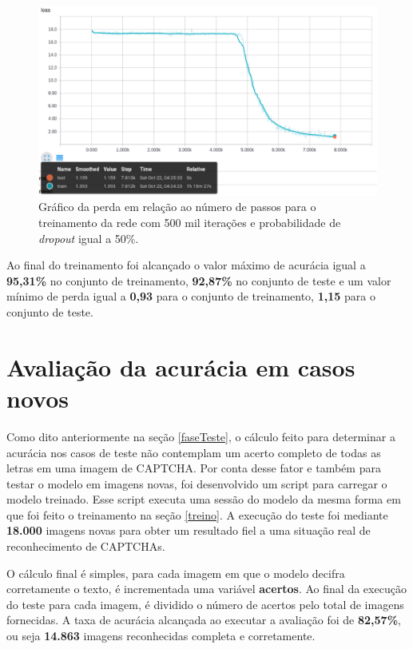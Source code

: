 \begin{figure}[H]
\centering
\includegraphics[scale=0.4]{imagens/loss_500k_dropout50}
\caption{Gráfico da perda em relação ao número de passos para o
  treinamento da rede com 500 mil iterações e probabilidade de
  \textit{dropout} igual a 50\%.}
\label{fig:loss_500k_dropout50}
\end{figure}

Ao final do treinamento foi alcançado o valor máximo de acurácia igual
a {\bf 95,31\%} no conjunto de treinamento, {\bf 92,87\%} no conjunto
de teste e um valor mínimo de perda igual a {\bf 0,93} para o conjunto
de treinamento, {\bf 1,15} para o conjunto de teste.

\section{Avaliação da acurácia em casos novos} \label{acuracia}

Como dito anteriormente na seção \ref{faseTeste}, o cálculo feito
para determinar a acurácia nos casos de teste não contemplam um acerto
completo de todas as letras em uma imagem de CAPTCHA. Por conta desse
fator e também para testar o modelo em imagens novas, foi desenvolvido
um script para carregar o modelo treinado. Esse script executa uma
sessão do modelo da mesma forma em que foi feito o treinamento na
seção \ref{treino}. A execução do teste foi mediante {\bf 18.000}
imagens novas para obter um resultado fiel a uma situação real de
reconhecimento de CAPTCHAs.

O cálculo final é simples, para cada imagem em que o modelo decifra
corretamente o texto, é incrementada uma variável {\bf acertos}. Ao
final da execução do teste para cada imagem, é dividido o número de
acertos pelo total de imagens fornecidas. A taxa de acurácia alcançada
ao executar a avaliação foi de {\bf 82,57\%}, ou seja {\bf 14.863}
imagens reconhecidas completa e corretamente.

